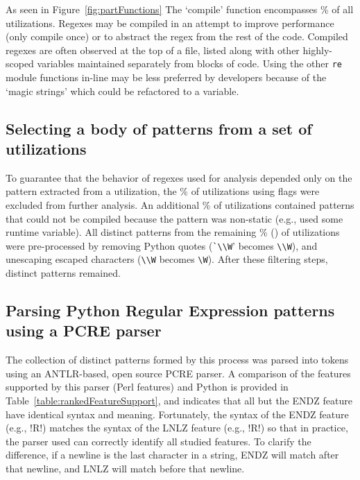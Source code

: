 As seen in Figure~\ref{fig:partFunctions} The `compile' function encompasses \% of all utilizations.  Regexes may be compiled in an attempt to improve performance (only compile once) or to abstract the regex from the rest of the code.  Compiled regexes are often observed at the top of a file, listed along with other highly-scoped variables maintained separately from blocks of code.  Using the other {\tt re} module functions in-line may be less preferred by developers because of the `magic strings' which could be refactored to a variable.

\subsection{Selecting a body of patterns from a set of utilizations}
To guarantee that the behavior of regexes used for analysis depended only on the pattern extracted from a utilization, the \%  of utilizations using flags were excluded from further analysis.  An additional \% of utilizations contained patterns that could not be compiled because the pattern was non-static (e.g., used some runtime variable).
All distinct patterns from the remaining \% () of utilizations were pre-processed by removing Python quotes (\verb!`\\W!' becomes \verb!\\W!), and unescaping escaped characters (\verb!\\W! becomes \verb!\W!).  After these filtering steps,  distinct patterns remained.

\subsection{Parsing Python Regular Expression patterns using a PCRE parser}
The collection of distinct patterns formed by this process was parsed into tokens using an ANTLR-based, open source PCRE parser.  A comparison of the features supported by this parser (Perl features) and Python is provided in Table~\ref{table:rankedFeatureSupport}, and indicates that all but the ENDZ feature have identical syntax and meaning.  Fortunately, the syntax of the ENDZ feature (e.g., \cverb!R\Z!) matches the syntax of the LNLZ feature (e.g., \cverb!R\Z!) so that in practice, the parser used can correctly identify all studied features.  To clarify the difference, if a newline is the last character in a string, ENDZ will match after that newline, and LNLZ will match before that newline.

